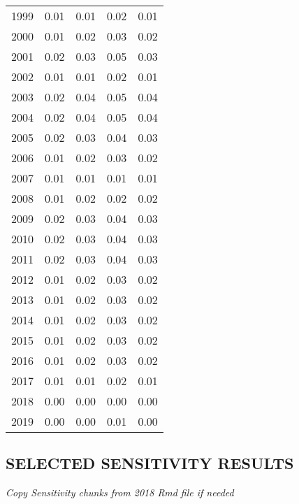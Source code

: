 \documentclass[11pt]{book}
\begin{document}
\begin{longtable}[]{@{}lrrrr@{}}
1999 & 0.01 & 0.01 & 0.02 & 0.01\tabularnewline
2000 & 0.01 & 0.02 & 0.03 & 0.02\tabularnewline
2001 & 0.02 & 0.03 & 0.05 & 0.03\tabularnewline
2002 & 0.01 & 0.01 & 0.02 & 0.01\tabularnewline
2003 & 0.02 & 0.04 & 0.05 & 0.04\tabularnewline
2004 & 0.02 & 0.04 & 0.05 & 0.04\tabularnewline
2005 & 0.02 & 0.03 & 0.04 & 0.03\tabularnewline
2006 & 0.01 & 0.02 & 0.03 & 0.02\tabularnewline
2007 & 0.01 & 0.01 & 0.01 & 0.01\tabularnewline
2008 & 0.01 & 0.02 & 0.02 & 0.02\tabularnewline
2009 & 0.02 & 0.03 & 0.04 & 0.03\tabularnewline
2010 & 0.02 & 0.03 & 0.04 & 0.03\tabularnewline
2011 & 0.02 & 0.03 & 0.04 & 0.03\tabularnewline
2012 & 0.01 & 0.02 & 0.03 & 0.02\tabularnewline
2013 & 0.01 & 0.02 & 0.03 & 0.02\tabularnewline
2014 & 0.01 & 0.02 & 0.03 & 0.02\tabularnewline
2015 & 0.01 & 0.02 & 0.03 & 0.02\tabularnewline
2016 & 0.01 & 0.02 & 0.03 & 0.02\tabularnewline
2017 & 0.01 & 0.01 & 0.02 & 0.01\tabularnewline
2018 & 0.00 & 0.00 & 0.00 & 0.00\tabularnewline
2019 & 0.00 & 0.00 & 0.01 & 0.00\tabularnewline
\bottomrule
\end{longtable}
\clearpage

\hypertarget{selected-sensitivity-results}{%
\subsection{SELECTED SENSITIVITY RESULTS}\label{selected-sensitivity-results}}

\emph{Copy Sensitivity chunks from 2018 Rmd file if needed}

\clearpage
\end{document}
